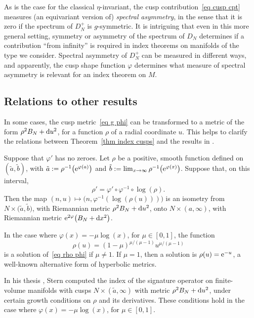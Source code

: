 \documentclass[pdftex]{sigma}%
\numberwithin{equation}{section}
\begin{document}
\begin{Remark}As is the case for the classical $\eta$-invariant, the cusp contribution~\eqref{eq cusp cpt} measures (an equivariant version of) \emph{spectral asymmetry}, in the sense that it is zero if the spectrum of $D_N^+$ is $g$-symmetric.
 It is intriguing that even in this more general setting, symmetry or asymmetry of the spectrum of $D_N$ determines if a contribution ``from infinity'' is required in index theorems on manifolds of the type we consider. Spectral asymmetry of $D_N^+$ can be measured in different ways, and apparently, the cusp shape function $\varphi$ determines what measure of spectral asymmetry is relevant for an index theorem on $M$.
\end{Remark}

\subsection{Relations to other results}\label{sec other results}

In some cases, the cusp metric~\eqref{eq g phi} can be transformed to a metric of the form $\rho^2 B_N + {\rm d}u^2$, for a function $\rho$ of a radial coordinate $u$. This helps to clarify the relations between Theorem~\ref{thm index cusps} and the results in \cite{Baier02, BB03, BBC12, Stern84}.

Suppose that $\varphi'$ has no zeroes.
Let $\rho$ be a positive, smooth function defined on $(\tilde a, \tilde b)$, with $\tilde a:= \rho^{-1}\big({\rm e}^{\varphi(a)}\big)$ and $\tilde b:= \lim_{x \to \infty} \rho^{-1}\big({\rm e}^{\varphi(x)}\big)$. Suppose that, on this interval,
\begin{equation} \label{eq rho phi}
\rho' = \varphi'\circ \varphi^{-1}\circ \log ( \rho).
\end{equation}
Then the map $(n, u) \mapsto \bigl(n, \varphi^{-1}(\log(\rho(u))) \bigr)$ is an isometry from $N \times \big(\tilde a, \tilde b\big)$, with Riemannian metric $\rho^2 B_N + {\rm d}u^2$, onto $N \times (a, \infty)$, with Riemannian metric ${\rm e}^{2\varphi} \big(B_N + {\rm d}x^2\big)$.

In the case where $\varphi(x) =-\mu\log(x)$, for $\mu \in [0,1]$, the function
\[
\rho(u) = (1-\mu)^{\mu/(\mu-1)} u^{\mu/(\mu-1)}
\]
is a solution of~\eqref{eq rho phi} if $\mu \not= 1$. If $\mu = 1$, then a solution is $\rho(u) = {\rm e}^{-u}$, a well-known alternative form of hyperbolic metrics.

In his thesis \cite{Stern84}, Stern computed the index of the signature operator on finite-volume manifolds with cusps $N \times (\tilde a, \infty)$ with metric $\rho^2 B_N + {\rm d}u^2$, under certain growth conditions on $\rho$ and its derivatives. These conditions hold in the case where $\varphi(x) =-\mu\log(x)$, for $\mu \in [0,1]$.
\end{document}
